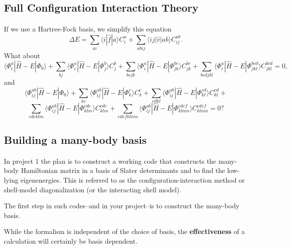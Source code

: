 \documentclass[%
twoside,                 %
final,                   %
10pt]{article}
\begin{document}
\subsection{Full Configuration Interaction Theory}

\paragraph{}
If we use a Hartree-Fock basis, we simplify this equation
\[
\Delta E=\sum_{ai}\langle i| \hat{f}|a \rangle C_{i}^{a}+
\sum_{abij}\langle ij | \hat{v}| ab \rangle C_{ij}^{ab}.
\]
What about
\[
\langle \Phi_i^a | \hat{H} -E| \Phi_0\rangle + \sum_{bj}\langle \Phi_i^a | \hat{H} -E|\Phi_{j}^{b} \rangle C_{j}^{b}+
\sum_{bcjk}\langle \Phi_i^a | \hat{H} -E|\Phi_{jk}^{bc} \rangle C_{jk}^{bc}+
\sum_{bcdjkl}\langle \Phi_i^a | \hat{H} -E|\Phi_{jkl}^{bcd} \rangle C_{jkl}^{bcd}=0,
\]
and
\[
\langle \Phi_{ij}^{ab} | \hat{H} -E| \Phi_0\rangle + \sum_{kc}\langle \Phi_{ij}^{ab} | \hat{H} -E|\Phi_{k}^{c} \rangle C_{k}^{c}+
\sum_{cdkl}\langle \Phi_{ij}^{ab} | \hat{H} -E|\Phi_{kl}^{cd} \rangle C_{kl}^{cd}+
\]
\[
\sum_{cdeklm}\langle \Phi_{ij}^{ab} | \hat{H} -E|\Phi_{klm}^{cde} \rangle C_{klm}^{cde}+\sum_{cdefklmn}\langle \Phi_{ij}^{ab} | \hat{H} -E|\Phi_{klmn}^{cdef} \rangle C_{klmn}^{cdef}=0?
\]







\subsection{Building a many-body basis}

\paragraph{}

In project 1 the plan  is to construct a working code that constructs the 
many-body Hamiltonian matrix in a basis of Slater determinants and to find the low-lying eigenenergies. 
This is referred to as the configuration-interaction method or shell-model diagonalization 
(or the interacting shell model). 

The first step in such codes--and in your project--is to construct the many-body basis.  

While the formalism is independent of the choice of basis, the \textbf{effectiveness} of a calculation 
will certainly be basis dependent. 
\end{document}
